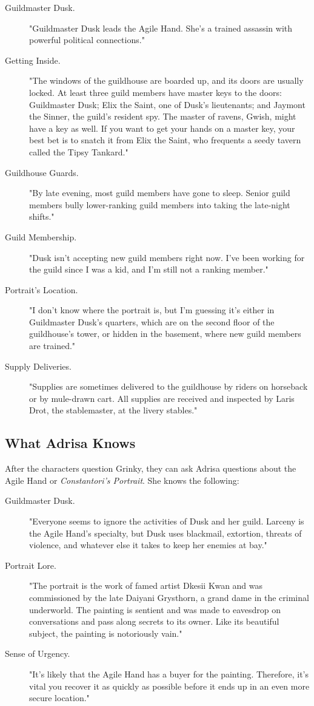 \documentclass[10pt,a4paper,twoside,bg=print,twocolumn,openany,nodeprecatedcode]{dndbook}
\begin{document}
\begin{description}
\item[Guildmaster Dusk.]
"Guildmaster Dusk leads the Agile Hand. She's a trained assassin with powerful political connections."
\item[Getting Inside.]
"The windows of the guildhouse are boarded up, and its doors are usually locked. At least three guild members have master keys to the doors: Guildmaster Dusk; Elix the Saint, one of Dusk's lieutenants; and Jaymont the Sinner, the guild's resident spy. The master of ravens, Gwish, might have a key as well. If you want to get your hands on a master key, your best bet is to snatch it from Elix the Saint, who frequents a seedy tavern called the Tipsy Tankard."
\item[Guildhouse Guards.]
"By late evening, most guild members have gone to sleep. Senior guild members bully lower-ranking guild members into taking the late-night shifts."
\item[Guild Membership.]
"Dusk isn't accepting new guild members right now. I've been working for the guild since I was a kid, and I'm still not a ranking member."
\item[Portrait's Location.]
"I don't know where the portrait is, but I'm guessing it's either in Guildmaster Dusk's quarters, which are on the second floor of the guildhouse's tower, or hidden in the basement, where new guild members are trained."
\item[Supply Deliveries.]
"Supplies are sometimes delivered to the guildhouse by riders on horseback or by mule-drawn cart. All supplies are received and inspected by Laris Drot, the stablemaster, at the livery stables."
\end{description}

\subsection{What Adrisa Knows}
After the characters question Grinky, they can ask Adrisa questions about the Agile Hand or \textit{Constantori's Portrait}. She knows the following:


\begin{description}
\item[Guildmaster Dusk.]
"Everyone seems to ignore the activities of Dusk and her guild. Larceny is the Agile Hand's specialty, but Dusk uses blackmail, extortion, threats of violence, and whatever else it takes to keep her enemies at bay."
\item[Portrait Lore.]
"The portrait is the work of famed artist Dkesii Kwan and was commissioned by the late Daiyani Grysthorn, a grand dame in the criminal underworld. The painting is sentient and was made to eavesdrop on conversations and pass along secrets to its owner. Like its beautiful subject, the painting is notoriously vain."
\item[Sense of Urgency.]
"It's likely that the Agile Hand has a buyer for the painting. Therefore, it's vital you recover it as quickly as possible before it ends up in an even more secure location."
\end{description}
\end{document}
